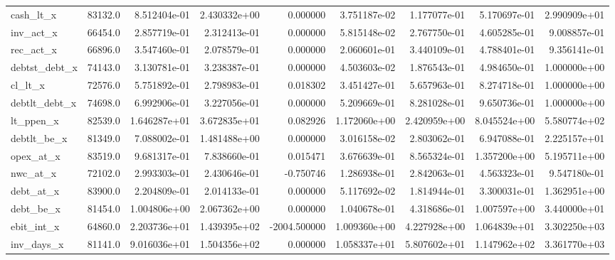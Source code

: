 \documentclass[10pt]{article}
\begin{document}
\begin{landscape}
\begin{longtable}{lrrrrrrrr}
cash\_lt\_x               &   83132.0 &  8.512404e-01 &  2.430332e+00 &      0.000000 &  3.751187e-02 &  1.177077e-01 &  5.170697e-01 &  2.990909e+01 \\
inv\_act\_x               &   66454.0 &  2.857719e-01 &  2.312413e-01 &      0.000000 &  5.815148e-02 &  2.767750e-01 &  4.605285e-01 &  9.008857e-01 \\
rec\_act\_x               &   66896.0 &  3.547460e-01 &  2.078579e-01 &      0.000000 &  2.060601e-01 &  3.440109e-01 &  4.788401e-01 &  9.356141e-01 \\
debtst\_debt\_x           &   74143.0 &  3.130781e-01 &  3.238387e-01 &      0.000000 &  4.503603e-02 &  1.876543e-01 &  4.984650e-01 &  1.000000e+00 \\
cl\_lt\_x                 &   72576.0 &  5.751892e-01 &  2.798983e-01 &      0.018302 &  3.451427e-01 &  5.657963e-01 &  8.274718e-01 &  1.000000e+00 \\
debtlt\_debt\_x           &   74698.0 &  6.992906e-01 &  3.227056e-01 &      0.000000 &  5.209669e-01 &  8.281028e-01 &  9.650736e-01 &  1.000000e+00 \\
lt\_ppen\_x               &   82539.0 &  1.646287e+01 &  3.672835e+01 &      0.082926 &  1.172060e+00 &  2.420959e+00 &  8.045524e+00 &  5.580774e+02 \\
debtlt\_be\_x             &   81349.0 &  7.088002e-01 &  1.481488e+00 &      0.000000 &  3.016158e-02 &  2.803062e-01 &  6.947088e-01 &  2.225157e+01 \\
opex\_at\_x               &   83519.0 &  9.681317e-01 &  7.838660e-01 &      0.015471 &  3.676639e-01 &  8.565324e-01 &  1.357200e+00 &  5.195711e+00 \\
nwc\_at\_x                &   72102.0 &  2.993303e-01 &  2.430646e-01 &     -0.750746 &  1.286938e-01 &  2.842063e-01 &  4.563323e-01 &  9.547180e-01 \\
debt\_at\_x               &   83900.0 &  2.204809e-01 &  2.014133e-01 &      0.000000 &  5.117692e-02 &  1.814944e-01 &  3.300031e-01 &  1.362951e+00 \\
debt\_be\_x               &   81454.0 &  1.004806e+00 &  2.067362e+00 &      0.000000 &  1.040678e-01 &  4.318686e-01 &  1.007597e+00 &  3.440000e+01 \\
ebit\_int\_x              &   64860.0 &  2.203736e+01 &  1.439395e+02 &  -2004.500000 &  1.009360e+00 &  4.227928e+00 &  1.064839e+01 &  3.302250e+03 \\
inv\_days\_x              &   81141.0 &  9.016036e+01 &  1.504356e+02 &      0.000000 &  1.058337e+01 &  5.807602e+01 &  1.147962e+02 &  3.361770e+03 \\

\end{longtable}
\end{landscape}
\end{document}
